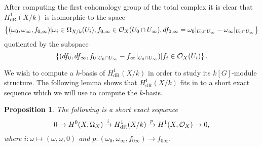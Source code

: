 \documentclass[11pt]{article} %
\theoremstyle{plain}
\newtheorem{prop}[defn]{Proposition}
\theoremstyle{remark}
\newcommand{\cO}{{\cal O}}
\newcommand{\ra}{\rightarrow}
\newcommand{\derhamhone}{H_{\text {dR}}^1(X/k)}
\begin{document}
After computing the first cohomology group of the total complex it is clear that $\derhamhone$ is isomorphic to the space
\begin{equation}\label{derhamconditions}
\left\{(\omega_0, \omega_\infty, f_{0,\infty}) | \omega_i\in \Omega_{X/k}(U_i), f_{0,\infty}\in \cO_X(U_0 \cap U_\infty), df_{0,\infty} = \omega_0|_{U_0\cap U_\infty} - \omega_\infty|_{U_0\cap U_\infty} \right\}
\end{equation}
quotiented by the subspace
\begin{equation}\label{quotient}
\left\{  (df_0, df_\infty, f_0|_{U_0\cap U_\infty} -f_\infty|_{U_0\cap U_\infty} )|f_i \in \cO_X(U_i)\right\}.
\end{equation}

We wish to compute a $k$-basis of $\derhamhone$ in order to study its $k[G]$-module structure.
The following lemma shows that $\derhamhone$ fits in to a short exact sequence which we will use to compute the $k$-basis.
\begin{prop}\label{ses}
The following is a short exact sequence
\begin{equation}\label{equationses}
0 \ra H^0(X,\Omega_X) \xrightarrow{i} \derhamhone \xrightarrow{p} H^1(X,\cO_X) \ra 0, 
\end{equation}
where $i \colon \omega \mapsto (\omega, \omega, 0)$ and $p \colon (\omega_0, \omega_\infty, f_{0 \infty}) \to f_{0 \infty}$.
\end{prop}
\end{document}
